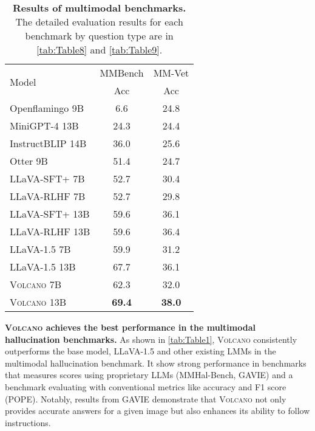 \documentclass[11pt]{article}
\newcommand{\Ours}{\textsc{Volcano}}
\begin{document}
\begin{table}[t]
\centering
\small
\begin{tabular}{lc|c}
\toprule
\multirow{2}{*}{Model} & \multicolumn{1}{c|}{MMBench} & \multicolumn{1}{c}{MM-Vet} \\
& Acc  & Acc  \\
\midrule
Openflamingo 9B & 6.6 & 24.8\\
MiniGPT-4 13B & 24.3 & 24.4 \\
InstructBLIP 14B & 36.0 & 25.6 \\
Otter 9B & 51.4	& 24.7  \\
LLaVA-SFT+ 7B & 52.7 & 30.4 \\
LLaVA-RLHF 7B & 52.7 & 29.8 \\
LLaVA-SFT+ 13B & 59.6 & 36.1 \\
LLaVA-RLHF 13B  & 59.6 & 36.4 \\
\midrule
LLaVA-1.5 7B & 59.9 & 31.2 \\
LLaVA-1.5 13B & 67.7 & 36.1 \\
{\Ours} 7B & 62.3 & 32.0 \\
{\Ours} 13B & \textbf{69.4} & \textbf{38.0} \\
\bottomrule
\end{tabular}
\caption{\textbf{Results of multimodal benchmarks.} The detailed evaluation results for each benchmark by question type are in \autoref{tab:Table8} and \autoref{tab:Table9}.}
\label{tab:Table3}
\end{table}
\textbf{{\Ours} achieves the best performance in the multimodal hallucination benchmarks.} As shown in \autoref{tab:Table1}, {\Ours} consistently outperforms the base model, LLaVA-1.5 and other existing LMMs in the multimodal hallucination benchmark. It show strong performance in benchmarks that measures scores using proprietary LLMs (MMHal-Bench, GAVIE) and a benchmark evaluating with conventional metrics like accuracy and F1 score (POPE). Notably, results from GAVIE demonstrate that {\Ours} not only provides accurate answers for a given image but also enhances its ability to follow instructions. \\
\end{document}

